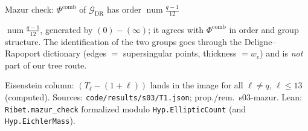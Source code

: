 \begin{frame}{Mazur check: $\Phi^{\mathrm{comb}}$ of $\mathcal G_{\mathrm{DR}}$ has order $\operatorname{num}\frac{q-1}{12}$}
\begin{itemize}
      $\operatorname{num}\frac{q-1}{12}$, generated by $(0)-(\infty)$; it agrees with $\Phi^{\mathrm{comb}}$ in order and group structure. The identification of the
      two groups goes through the Deligne--Rapoport dictionary (edges $=$ supersingular points, thickness $=w_e$) and is \emph{not} part of our tree route.
  \end{itemize}
  \vfill
  {\tiny Eisenstein column: $(T_\ell-(1+\ell))$ lands in the image for all $\ell\ne q$, $\ell\le 13$ (computed).
  Sources: \texttt{code/results/s03/T1.json}; prop./rem.\ s03-mazur. Lean: \texttt{Ribet.mazur\_check} formalized modulo \texttt{Hyp.EllipticCount} (and \texttt{Hyp.EichlerMass}).}
\end{frame}
